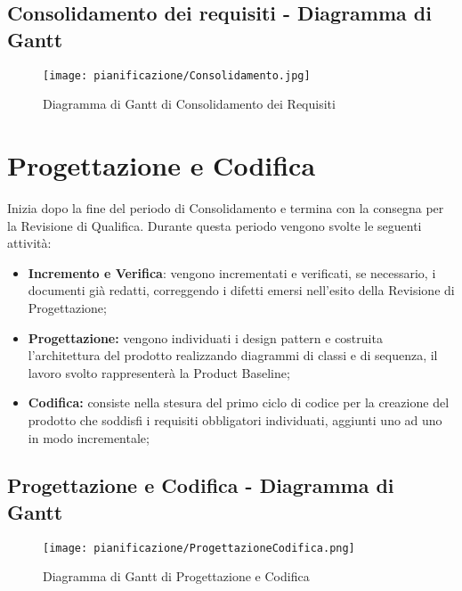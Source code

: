 \documentclass[../PianodiProgetto.tex]{subfiles}
\begin{document}
	\subsection{Consolidamento dei requisiti - Diagramma di Gantt}
	\begin{figure}[H]
		\texttt{[image: pianificazione/Consolidamento.jpg]}	
		\caption{Diagramma di Gantt di Consolidamento dei Requisiti}\label{fig:2}
	\end{figure}
	\newpage
	\section{Progettazione e Codifica}
	Inizia dopo la fine del periodo di Consolidamento e termina con la consegna per la Revisione di Qualifica. Durante questa periodo vengono svolte le seguenti attività:
	\begin{itemize}
		\item \textbf{Incremento e Verifica}: vengono incrementati e verificati, se necessario, i documenti già redatti, correggendo i difetti emersi nell'esito della Revisione di Progettazione;	
		\item \textbf{Progettazione:} vengono individuati i design pattern e costruita l'architettura del prodotto realizzando diagrammi di classi e di sequenza, il lavoro svolto rappresenterà la Product Baseline;
		\item \textbf{Codifica:} consiste nella stesura del primo ciclo di codice per la creazione del prodotto che soddisfi i requisiti obbligatori individuati, aggiunti uno ad uno in modo incrementale;
	\end{itemize}
	\subsection{Progettazione e Codifica - Diagramma di Gantt}
	\begin{figure}[H]
		\texttt{[image: pianificazione/ProgettazioneCodifica.png]}	
		\caption{Diagramma di Gantt di Progettazione e Codifica}\label{fig:3}	
	\end{figure}
	\newpage
\end{document}

